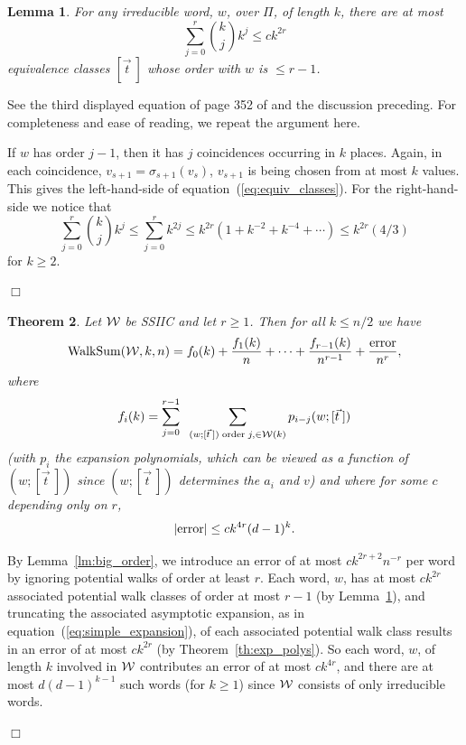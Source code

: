 \documentclass[12pt]{article}
\newtheorem{theorem}{Theorem}[section]
\newtheorem{lemma}[theorem]{Lemma}
\newcommand{\walksum}[2]{{{\rm WalkSum}(#1,#2)}}
\newcommand{\cw}{{\cal W}}
\newcommand{\proof}{{\par\noindent {\bf Proof}\space\space}}
\newcommand{\proofbox}{\begin{flushright}$\Box$\end{flushright}}
\begin{document}
\begin{lemma}\label{lm:equiv_classes}
For any irreducible word, $w$, over $\Pi$, of length $k$,
there are at most 
\begin{equation}\label{eq:equiv_classes}
\sum_{j=0}^r \binom{k}{j} k^j \le c k^{2r}
\end{equation}
equivalence classes $[\vec t\>]$ whose order with $w$ is $\le r-1$.
\end{lemma}
\proof See the third displayed equation of page 352 of
\cite{friedman_random_graphs} and the discussion preceding.  For
completeness and ease of reading, we repeat the argument here.

If $w$ has order $j-1$, then it has $j$ coincidences occurring in $k$
places.  Again, in each coincidence, $v_{s+1}=\sigma_{s+1}(v_s)$,
$v_{s+1}$ is being chosen from at most $k$ values.  This gives the
left-hand-side of equation~(\ref{eq:equiv_classes}).  For the
right-hand-side we notice that
$$
\sum_{j=0}^r \binom{k}{j} k^j \le \sum_{j=0}^r k^{2j}\le
k^{2r}(1+k^{-2}+k^{-4}+\cdots) \le k^{2r} (4/3)
$$
for $k\ge 2$.
\proofbox

\begin{theorem}\label{th:SSIICexpansion}
Let $\cw$ be SSIIC and let $r\ge 1$.  Then for all $k\le n/2$ we have
$$
\walksum{\cw}{k,n} =   f_0(k)+\frac{  f_1(k)}{n}+\cdots+
\frac{  f_{r-1}(k)}{n^{r-1}}+\frac{{\rm error}}{n^r},
$$
where 
$$
f_i(k) = \sum_{j=0}^{r-1}\;\; \sum_{(w;[\vec t\>]){\rm \;order\;}j,\in\cw(k)}
p_{i-j}(w;[\vec t\>])
$$
(with $p_i$ the expansion polynomials, which can be viewed as a
function of $(w;[\vec t\>])$ since $(w;[\vec t\>])$ determines the
$a_i$ and $v$)
and where for some $c$ depending only on $r$,
$$
|{\rm error}| \le ck^{4r}(d-1)^k.
$$
\end{theorem}
\proof By Lemma~\ref{lm:big_order}, we introduce an error of at most
$ck^{2r+2}n^{-r}$ per word by ignoring potential walks of order at least
$r$.
Each word, $w$, has at most $ck^{2r}$ associated potential walk classes
of order at most $r-1$
(by Lemma~\ref{lm:equiv_classes}), and truncating the associated 
asymptotic expansion, as in equation~(\ref{eq:simple_expansion}),
of each associated potential walk class
results in an error of at most $ck^{2r}$
(by Theorem~\ref{th:exp_polys}).
So each word, $w$, of length $k$ involved in $\cw$
contributes an error of at most
$ck^{4r}$, and there are at most $d(d-1)^{k-1}$ such words
(for $k\ge 1$) since $\cw$ consists of only irreducible words.
\proofbox
\end{document}
